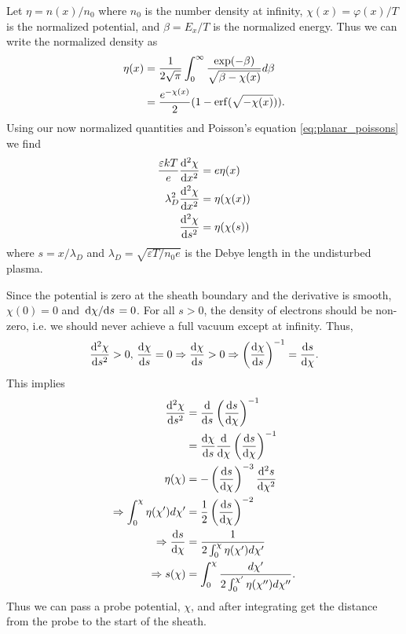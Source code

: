 Let $\eta = n(x) / n_0$ where $n_0$ is the number density at infinity, $\chi(x) = \varphi(x) / T$ is the normalized potential, and $\beta = E_x / T$ is the normalized energy. Thus we can write the normalized density as
\begin{align}
  \eta(x) &= \frac{1}{2\sqrt{\pi}} \int_{0}^{\infty} \frac{\exp(-\beta)}{\sqrt{\beta - \chi(x)}} d\beta \nonumber \\
  &= \frac{e^{-\chi(x)}}{2} (1 - \erf(\sqrt{-\chi(x)})) \label{eq:planar_normalized_density}.
\end{align}
Using our now normalized quantities and Poisson's equation \ref{eq:planar_poissons} we find
\begin{align}
  \frac{\varepsilon kT}{e}\dv[2]{\chi}{x} &= e \eta(x) \nonumber \\
  \lambda_D^2 \dv[2]{\chi}{x} &= \eta(\chi(x)) \nonumber \\
  \dv[2]{\chi}{s} &= \eta(\chi(s))
  \label{eq:planar_normalized_poissons}
\end{align}
where $s = x / \lambda_D$ and $\lambda_D = \sqrt{\varepsilon T / n_0 e}$ is the Debye length in the undisturbed plasma.

Since the potential is zero at the sheath boundary and the derivative is smooth, $\chi(0) = 0$ and $\dv*{\chi}{s}(0) = 0$. For all $s > 0$, the density of electrons should be non-zero, i.e. we should never achieve a full vacuum except at infinity. Thus,
\begin{equation*}
  \dv[2]{\chi}{s}(s) > 0, \, \dv{\chi}{s}(0) = 0 \Rightarrow \dv{\chi}{s}(s) > 0 \Rightarrow \left(\dv{\chi}{s}\right)^{-1} = \dv{s}{\chi}.
\end{equation*}
This implies
\begin{align*}
  \dv[2]{\chi}{s} &= \dv{}{s} \left(\dv{s}{\chi}\right)^{-1} \\
  &= \dv{\chi}{s} \dv{}{\chi} \left(\dv{s}{\chi}\right)^{-1} \\
  \eta(\chi) &= -\left(\dv{s}{\chi}\right)^{-3} \dv[2]{s}{\chi}\\
  \Rightarrow \int_{0}^{\chi} \eta(\chi') d\chi' &= \frac{1}{2} \left(\dv{s}{\chi}\right)^{-2} \\
  \Rightarrow \dv{s}{\chi} &= \frac{1}{2 \int_{0}^{\chi} \eta(\chi') d\chi'} \\
  \Rightarrow s(\chi) &= \int_{0}^{\chi} \frac{d\chi'}{2 \int_{0}^{\chi'} \eta(\chi'') d\chi''}.
\end{align*}
Thus we can pass a probe potential, $\chi$, and after integrating get the distance from the probe to the start of the sheath.

